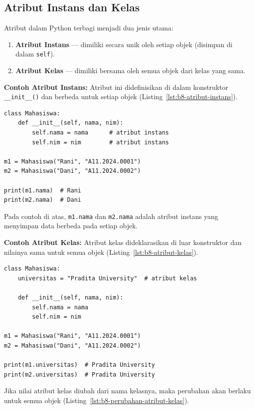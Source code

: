 \subsection{Atribut Instans dan Kelas}

Atribut dalam Python terbagi menjadi dua jenis utama:
\begin{enumerate}
    \item \textbf{Atribut Instans} — dimiliki secara unik oleh setiap objek (disimpan di dalam \texttt{self}).
    \item \textbf{Atribut Kelas} — dimiliki bersama oleh semua objek dari kelas yang sama.
\end{enumerate}

\noindent\textbf{Contoh Atribut Instans:}
Atribut ini didefinisikan di dalam konstruktor \texttt{__init__()} dan berbeda untuk setiap objek (Listing~\ref{lst:b8-atribut-instans}).

\begin{lstlisting}[style=PythonStyle, caption={Atribut Instans}, label={lst:b8-atribut-instans}]
class Mahasiswa:
    def __init__(self, nama, nim):
        self.nama = nama      # atribut instans
        self.nim = nim        # atribut instans

m1 = Mahasiswa("Rani", "A11.2024.0001")
m2 = Mahasiswa("Dani", "A11.2024.0002")

print(m1.nama)  # Rani
print(m2.nama)  # Dani
\end{lstlisting}

Pada contoh di atas, \texttt{m1.nama} dan \texttt{m2.nama} adalah atribut instans yang menyimpan data berbeda pada setiap objek.

\noindent\textbf{Contoh Atribut Kelas:}
Atribut kelas dideklarasikan di luar konstruktor dan nilainya sama untuk semua objek (Listing~\ref{lst:b8-atribut-kelas}).

\begin{lstlisting}[style=PythonStyle, caption={Atribut Kelas}, label={lst:b8-atribut-kelas}]
class Mahasiswa:
    universitas = "Pradita University"  # atribut kelas

    def __init__(self, nama, nim):
        self.nama = nama
        self.nim = nim

m1 = Mahasiswa("Rani", "A11.2024.0001")
m2 = Mahasiswa("Dani", "A11.2024.0002")

print(m1.universitas)  # Pradita University
print(m2.universitas)  # Pradita University
\end{lstlisting}

Jika nilai atribut kelas diubah dari nama kelasnya, maka perubahan akan berlaku untuk semua objek (Listing~\ref{lst:b8-perubahan-atribut-kelas}).

